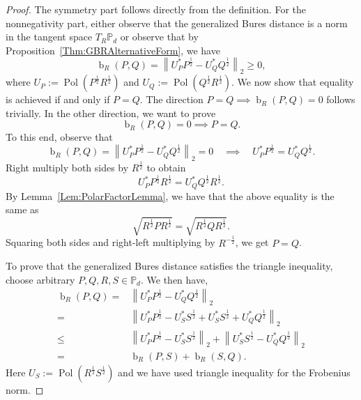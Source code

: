\documentclass[12pt]{article}
\theoremstyle{definition}
\begin{document}
\begin{proof}
    The symmetry part follows directly from the definition. For the nonnegativity part, either observe that the generalized Bures distance is a norm in the tangent space $T_R \mathbb P_d$ or observe that by Proposition~\ref{Thm:GBRAlternativeForm}, we have 
    \begin{equation}
        \operatorname{b}_R(P,Q) = \left\| U_P^* P^{\frac12}  - U_Q^* Q ^{\frac12} \right\|_2 \geq 0, 
    \end{equation}    
    where $U_P := \operatorname{Pol}\left(P^{\frac12}  R  ^{\frac12} \right)$ and $U_Q := \operatorname{Pol}\left(Q ^{\frac12} R  ^{\frac12} \right)$. We now show that equality is achieved if and only if $P = Q$. The direction $P=Q \implies \operatorname{b}_R(P,Q) = 0$ follows trivially. In the other direction, we want to prove
    \begin{equation}
        \operatorname{b}_R(P,Q) = 0 \implies P = Q.
    \end{equation}
    To this end, observe that
    \begin{equation}
        \operatorname{b}_R(P,Q) = \left\| U_P^* P^{\frac12}  - U_Q^* Q^{\frac12} \right\|_2 = 0 \quad \implies  \quad U_P^* P^{\frac12}  =  U_Q^* Q^{\frac12}. 
    \end{equation}
    Right multiply both sides by $R ^{\frac12} $ to obtain
    \begin{equation}
        U_P^* P^{\frac12}  R ^{\frac12} = U_Q^* Q ^{\frac12} R ^{\frac12}. 
    \end{equation}
    By Lemma~\ref{Lem:PolarFactorLemma}, we have that the above equality is the same as
    \begin{equation}
        \sqrt{R ^{\frac12} P R ^{\frac12} } = \sqrt{R ^{\frac12} Q R ^{\frac12} }.
    \end{equation}
    Squaring both sides and right-left multiplying by $ R^{-\frac12} $, we get $P = Q$.
    
    To prove that the generalized Bures distance satisfies the triangle inequality, choose arbitrary $P,Q,R,S \in \mathbb P_d$. We then have,
    \begin{equation}
    \begin{aligned}
        \operatorname{b}_R(P,Q) =  &\left\| U_P^* P^{\frac12}  - U_Q^* Q^{\frac12}   \right\|_2  \\ 
        = &\left\| U_P^* P^{\frac12}  - U_S^* S ^{\frac12} + U_S^* S ^{\frac12} +  U_Q^* Q^{\frac12} \right\|_2 \\ \leq & \left\| U_P^* P^{\frac12}  - U_S^* S ^{\frac12} \right\|_2 + \left\| U_S^* S ^{\frac12} - U_Q^* Q ^{\frac12} \right\|_2  \\ = &\operatorname{b}_R(P,S) + \operatorname{b}_R(S,Q).   
    \end{aligned}
    \end{equation} 
    Here $U_S := \operatorname{Pol}\left(R ^{\frac12} S ^{\frac12} \right)$ and we have used triangle inequality for the Frobenius norm.
\end{proof}
\end{document}
